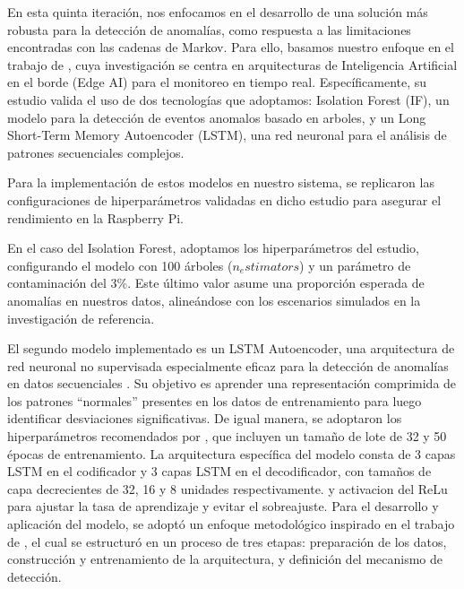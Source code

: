       En esta quinta iteración, nos enfocamos en el desarrollo de una solución más robusta para la detección de anomalías, como respuesta a las limitaciones encontradas con las cadenas de Markov. Para ello, basamos nuestro enfoque en el trabajo de \citeauthor{reis2025edge} \citeyear{reis2025edge}, cuya investigación se centra en arquitecturas de Inteligencia Artificial en el borde (Edge AI) para el monitoreo en tiempo real. Específicamente, su estudio valida el uso de dos tecnologías que adoptamos: Isolation Forest (IF), un modelo para la detección de eventos anomalos basado en arboles, y un Long Short-Term Memory Autoencoder (LSTM), una red neuronal para el análisis de patrones secuenciales complejos.

      Para la implementación de estos modelos en nuestro sistema, se replicaron las configuraciones de hiperparámetros validadas en dicho estudio para asegurar el rendimiento en la Raspberry Pi.

      En el caso del Isolation Forest, adoptamos los hiperparámetros del estudio, configurando el modelo con 100 árboles ($n_estimators$) y un parámetro de contaminación del 3\%. Este último valor asume una proporción esperada de anomalías en nuestros datos, alineándose con los escenarios simulados en la investigación de referencia.

      El segundo modelo implementado es un LSTM Autoencoder, una arquitectura de red neuronal no supervisada especialmente eficaz para la detección de anomalías en datos secuenciales \cite{malhotra2015long}. Su objetivo es aprender una representación comprimida de los patrones ``normales'' presentes en los datos de entrenamiento para luego identificar desviaciones significativas. De igual manera, se adoptaron los hiperparámetros recomendados por \citeauthor{reis2025edge} \citeyear{reis2025edge}, que incluyen un tamaño de lote de 32 y 50 épocas de entrenamiento. La arquitectura específica del modelo consta de 3 capas LSTM en el codificador y 3 capas LSTM en el decodificador, con tamaños de capa decrecientes de 32, 16 y 8 unidades respectivamente. y activacion del ReLu para ajustar la tasa de aprendizaje y evitar el sobreajuste.
      Para el desarrollo y aplicación del modelo, se adoptó un enfoque metodológico inspirado en el trabajo de \citeauthor{reis2025edge} \citeyear{reis2025edge}, el cual se estructuró en un proceso de tres etapas: preparación de los datos, construcción y entrenamiento de la arquitectura, y definición del mecanismo de detección.

